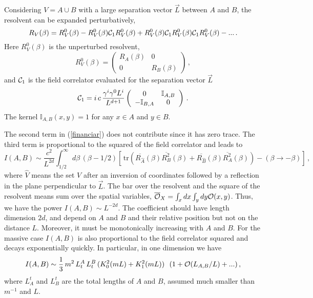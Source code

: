 \documentclass[11pt]{article}
\begin{document}
Considering $V=A\cup B$ with a large separation vector $\vec{L}$ between $A$ and $B$, the resolvent can be expanded perturbatively,
\begin{equation}
R_V(\beta)=R_V^0(\beta)-R_V^0(\beta){\cal C}_1 R_V^0(\beta)+R_V^0(\beta){\cal C}_1 R_V^0(\beta){\cal C}_1 R_V^0(\beta)-...\,.
\label{financiar1}
\end{equation}
Here $R_V^0(\beta)$ is the unperturbed resolvent, 
\begin{equation}
R_V^0(\beta)=\left(\begin{array}{cc}
R_A(\beta) & 0 \\
0 & R_B(\beta) 
 \end{array}
\right)\,,
\end{equation}
and ${\cal C}_1$ is the field correlator evaluated for the separation vector $\vec{L}$ 
\begin{equation}
{\cal C}_1=i\,c \,\frac{\gamma^i \gamma^0 L^i}{L^{d+1}} \left(\begin{array}{cc}
0& {\mathbb I}_{A,B} \\
-{\mathbb I}_{B,A} & 0 
 \end{array}
\right)\,.
\end{equation}
The kernel ${\mathbb I}_{A,B}(x,y)=1$ for any $x\in A$ and $y\in B$. 




The second term in (\ref{financiar}) does not contribute since it has zero trace. The third term is proportional to the squared of the field correlator and leads to 
\begin{equation}
I(A,B)\sim \frac{c^2}{L^{2 d}}\int^\infty_{1/2} d\beta\,\left(\beta-1/2\right)\left[\, \textrm{tr} \left(  \overline{R_{\hat{A}}}(\beta) \overline{R_B^2}(\beta) +  \overline{R_{\hat{B}}}(\beta)  \overline{R_A^2}(\beta)\right)            -\left(\beta\rightarrow -\beta\right)\right]\,,\label{inn}
\end{equation}
where $\hat{V}$ means the set $V$ after an inversion of coordinates followed by a reflection in the plane perpendicular to $\vec{L}$. The bar over the resolvent and the square of the resolvent means sum over the spatial variables, $\overline{{\cal O}}_X=\int_x dx\int_y dy {\cal O}(x,y)$.
Thus, we have the power $I(A,B)\sim L^{-2d}$. The coefficient should have length dimension $2d$, and depend on $A$ and $B$ and their relative position but not on the distance $L$. Moreover, it must be monotonically increasing with $A$ and $B$. For the massive case $I(A,B)$ is also proportional to the field correlator squared and decays exponentially quickly. In particular, in one dimension we have \cite{futuro}
\begin{equation}
I(A,B)\sim \frac{1}{3} \,m^2 \,L^A_t\, L^B_t \,(K_0^2(m L)+ K_1^2(m L)) \,\,\,\,(1 + {\cal O} (L_{A,B}/L)+...)\,,  
\end{equation}
where $L_A^t$ and $L_B^t$ are the total lengths of $A$ and $B$, assumed much smaller than $m^{-1}$ and $L$.  
\end{document}
